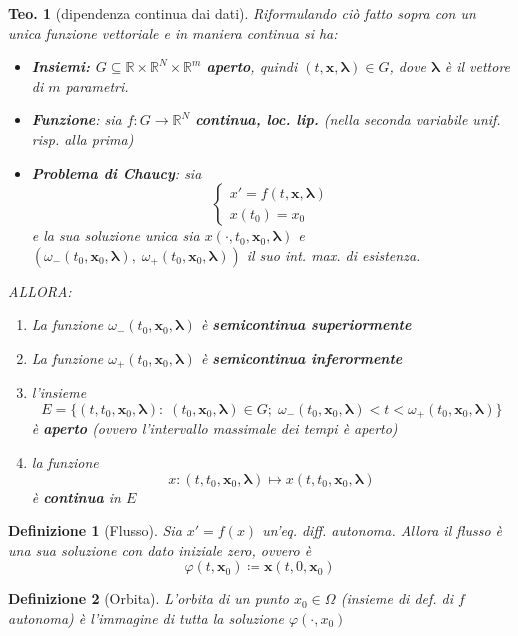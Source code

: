 \documentclass[a4paper,10pt]{article}
\newcommand{\bv}{\boldsymbol} %
\newcommand{\re}{\mathbb{R}} %
\theoremstyle{indentdefinition}
\newtheorem{defn}{Definizione}[section]
\theoremstyle{indenttheorem}
\newtheorem{thm}{Teo.}
\theoremstyle{myremark}
\theoremstyle{indentgeneral}
\begin{document}
\begin{thm}[dipendenza continua dai dati]
    Riformulando ciò fatto sopra con un unica funzione vettoriale e in maniera continua si ha:
    \begin{itemize}
        \item \textbf{Insiemi: $G\subseteq \re\times\re^N\times\re^m$} \textbf{aperto}, quindi $(t,\bv{x},\bv{\lambda})\in G$, dove $\bv{\lambda}$ è il vettore di $m$ parametri.
        \item \textbf{Funzione}: sia $f:G\to\re^N$ \textbf{continua, loc. lip.} (nella seconda variabile unif. risp. alla prima)
        \item \textbf{Problema di Chaucy}: sia
        $$\begin{cases}
            x'=f(t,\bv{x},\bv{\lambda}) \\
            x(t_0)=x_0
        \end{cases}$$
        e la sua soluzione unica sia $x(\cdot,t_0,\bv{x}_0,\bv{\lambda})$ e $(\omega_-(t_0,\bv{x}_0,\bv{\lambda}),\;\omega_+(t_0,\bv{x}_0,\bv{\lambda}))$ il suo int. max. di esistenza.
    \end{itemize}
    ALLORA:
    \begin{enumerate}
        \item La funzione $\omega_-(t_0,\bv{x}_0,\bv{\lambda})$ è \textbf{semicontinua superiormente}
        \item La funzione $\omega_+(t_0,\bv{x}_0,\bv{\lambda})$ è \textbf{semicontinua inferormente}
        \item l'insieme $$E=\{(t,t_0,\bv{x}_0,\bv{\lambda}):\; (t_0,\bv{x}_0,\bv{\lambda})\in G;\;\omega_-(t_0,\bv{x}_0,\bv{\lambda})<t<\omega_+(t_0,\bv{x}_0,\bv{\lambda})\}$$ è \textbf{aperto} (ovvero l'intervallo massimale dei tempi è aperto)
        \item la funzione $$x:(t,t_0,\bv{x}_0,\bv{\lambda})\mapsto x(t, t_0,\bv{x}_0,\bv{\lambda})$$ è \textbf{continua} in $E$
    \end{enumerate}
\end{thm}

\begin{defn}[Flusso]
Sia $x'=f(x)$ un'eq. diff. autonoma. Allora il flusso è una sua soluzione con dato iniziale zero, ovvero è $$\varphi(t,\bv{x}_0)\coloneqq \bv{x}(t,0,\bv{x}_0)$$    
\end{defn}

\begin{defn}[Orbita]
L'orbita di un punto $x_0\in\Omega$ (insieme di def. di $f$ autonoma) è l'immagine di tutta la soluzione $\varphi(\cdot,x_0)$
\end{defn}
\end{document}

